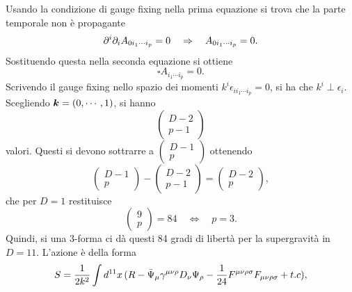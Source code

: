 Usando la condizione di gauge fixing nella prima equazione si trova che la parte temporale non è propagante 
\begin{equation}
    \partial^i\partial_i A_{0i_1\cdots i_p} = 0\quad\Rightarrow\quad A_{0i_1\cdots i_p} = 0.
\end{equation}
Sostituendo questa nella seconda equazione si ottiene 
\begin{equation}
    \square A_{i_1\cdots i_p} = 0.
\end{equation}
Scrivendo il gauge fixing nello spazio dei momenti $k^i\epsilon_{ii_1\cdots i_p} = 0$, si ha che $k^i \perp \epsilon_i$. Scegliendo $\bm{k} = (0,\cdots,1)$, si hanno 
\begin{equation}
    \begin{pmatrix}
        D - 2 \\
        p - 1
    \end{pmatrix}
\end{equation}
valori. Questi si devono sottrarre a $\begin{pmatrix}
    D - 1 \\
    p
\end{pmatrix}$ ottenendo 
    \begin{equation}
        \begin{pmatrix}
        D - 1 \\
        p
    \end{pmatrix} - 
    \begin{pmatrix}
        D - 2 \\
        p - 1
    \end{pmatrix} = 
    \begin{pmatrix}
        D - 2 \\
        p
    \end{pmatrix},
\end{equation}
che per $D = 1$ restituisce 
\begin{equation}
    \begin{pmatrix}
        9 \\
        p
    \end{pmatrix} = 84 \quad\Longleftrightarrow\quad p = 3.
\end{equation}
Quindi, si una $3$-forma ci dà questi 84 gradi di libertà per la supergravità in $D = 11$. L'azione è della forma 
\begin{equation}
    S = \frac{1}{2k^2}\int d^{11}x\,(R - \bar{\Psi}_\mu\gamma^{\mu\nu\rho}D_\nu\Psi_\rho - \frac{1}{24}F^{\mu\nu\rho\sigma}F_{\mu\nu\rho\sigma} + t.c),
\end{equation}
